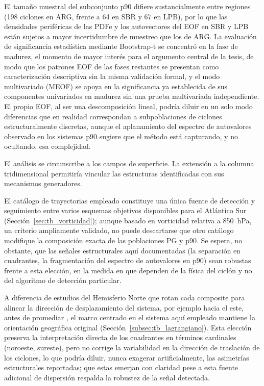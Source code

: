 El tamaño muestral del subconjunto p90 difiere sustancialmente entre regiones (198 ciclones en ARG, frente a 64 en SBR y 67 en LPB), por lo que las densidades periféricas de las PDFe y los autovectores del EOF en SBR y LPB están sujetos a mayor incertidumbre de muestreo que los de ARG. La evaluación de significancia estadística mediante Bootstrap-t se concentró en la fase de madurez, el momento de mayor interés para el argumento central de la tesis, de modo que los patrones EOF de las fases restantes se presentan como caracterización descriptiva sin la misma validación formal, y el modo multivariado (MEOF) se apoya en la significancia ya establecida de sus componentes univariados en madurez sin una prueba multivariada independiente. El propio EOF, al ser una descomposición lineal, podría diluir en un solo modo diferencias que en realidad correspondan a subpoblaciones de ciclones estructuralmente discretas, aunque el aplanamiento del espectro de autovalores observado en los sistemas p90 sugiere que el método está capturando, y no ocultando, esa complejidad.

El análisis se circunscribe a los campos de superficie. La extensión a la columna tridimensional permitiría vincular las estructuras identificadas con sus mecanismos generadores.

El catálogo de trayectorias empleado \citep{gramcianinov2020analysis} constituye una única fuente de detección y seguimiento entre varios esquemas objetivos disponibles para el Atlántico Sur (Sección~\ref{sec:tb_vorticidad}); aunque basado en vorticidad relativa a 850~hPa, un criterio ampliamente validado, no puede descartarse que otro catálogo modifique la composición exacta de las poblaciones PG y p90. Se espera, no obstante, que las señales estructurales aquí documentadas (la separación en cuadrantes, la fragmentación del espectro de autovalores en p90) sean robustas frente a esta elección, en la medida en que dependen de la física del ciclón y no del algoritmo de detección particular.

A diferencia de estudios del Hemisferio Norte que rotan cada composite para alinear la dirección de desplazamiento del sistema, por ejemplo hacia el este, antes de promediar \citep{rudeva2011composite, priestley2022improved}, el marco centrado en el sistema aquí empleado mantiene la orientación geográfica original (Sección~\ref{subsec:tb_lagrangiano}). Esta elección preserva la interpretación directa de los cuadrantes en términos cardinales (noroeste, sureste), pero no corrige la variabilidad en la dirección de traslación de los ciclones, lo que podría diluir, nunca exagerar artificialmente, las asimetrías estructurales reportadas; que estas emerjan con claridad pese a esta fuente adicional de dispersión respalda la robustez de la señal detectada.

